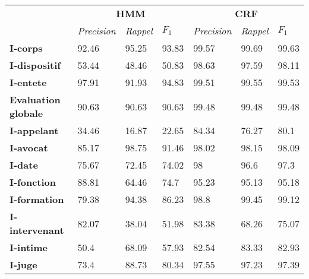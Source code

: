 \begin{table}[!ht]
	\centering
	\footnotesize
	\begin{tabular}{|l|l|l|l|l|l|l|}
		\hline
	\multirow{2}{*}{}	& \multicolumn{3}{c}{\textbf{HMM}}  &      \multicolumn{3}{|c|}{\textbf{CRF}}          \\ \cline{2-7}
		& \textit{Precision} & \textit{Rappel} & $F_1$ & \textit{Precision} & \textit{Rappel} & $F_1$ \\ \hline
		\textbf{I-corps}       & 92.46              & 95.25           & 93.83       & 99.57              & 99.69           & 99.63       \\ 
		\textbf{I-dispositif}  & 53.44              & 48.46           & 50.83       & 98.63              & 97.59           & 98.11       \\ 
		\textbf{I-entete}      & 97.91              & 91.93           & 94.83       & 99.51              & 99.55           & 99.53       \\ \hline
		\textbf{Evaluation globale}       & 90.63              & 90.63           & 90.63       & 99.48              & 99.48           & 99.48       \\ \hline
		\noalign{\smallskip}\hline\noalign{\smallskip}
		\textbf{I-appelant}    & 34.46              & 16.87           & 22.65       & 84.34              & 76.27           & 80.1        \\ 
		\textbf{I-avocat}      & 85.17              & 98.75           & 91.46       & 98.02              & 98.15           & 98.09       \\ 
		\textbf{I-date}        & 75.67              & 72.45           & 74.02       & 98                 & 96.6            & 97.3        \\ 
		\textbf{I-fonction}    & 88.81              & 64.46           & 74.7        & 95.23              & 95.13           & 95.18       \\ 
		\textbf{I-formation}   & 79.38              & 94.38           & 86.23       & 98.8               & 99.45           & 99.12       \\ 
		\textbf{I-intervenant} & 82.07              & 38.04           & 51.98       & 83.38              & 68.26           & 75.07       \\ 
		\textbf{I-intime}      & 50.4               & 68.09           & 57.93       & 82.54              & 83.33           & 82.93       \\ 
		\textbf{I-juge}        & 73.4               & 88.73           & 80.34       & 97.55              & 97.23           & 97.39       \\ 

\end{tabular}
\end{table}
